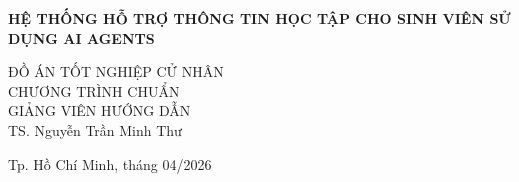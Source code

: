\begin{titlepage}
\begin{center}

{ \Large \bfseries HỆ THỐNG HỖ TRỢ THÔNG TIN HỌC TẬP CHO SINH VIÊN SỬ DỤNG AI AGENTS\\[2cm] } 


\large ĐỒ ÁN TỐT NGHIỆP CỬ NHÂN\\
\large CHƯƠNG TRÌNH CHUẨN\\[2cm]

GIẢNG VIÊN HƯỚNG DẪN\\
TS. Nguyễn Trần Minh Thư\\


\vfill
Tp. Hồ Chí Minh, tháng 04/2026

\end{center}
\end{titlepage}
